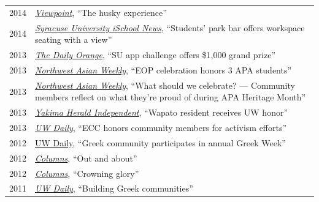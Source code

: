 \documentclass[12pt]{article}
\begin{document}
{\begin{longtable}{R{0.75in}p{5.0in}}
\footnotesize{2014} & \href{https://issuu.com/uwalumni/docs/viewpoint_2014fall}{\textit{Viewpoint}}, ``The husky experience''\\

\footnotesize{2014} & \href{https://web.archive.org/web/2026/https://news.syr.edu/blog/2014/10/28/students-park-bar-offers-workspace-seating-with-a-view-16177/}{\textit{Syracuse University iSchool News}}, ``Students' park bar offers workspace seating with a view''\\

\footnotesize{2013} & \href{https://dailyorange.com/2013/10/su-app-challenge-offers-1000-grand-prize/}{\textit{The Daily Orange}}, ``SU app challenge offers \$1,000 grand prize''\\

\footnotesize{2013} & \href{https://www.nwasianweekly.com/2013/07/uw-2013-eop-celebration-honors-3-apa-students/}{\textit{Northwest Asian Weekly}}, ``EOP celebration honors 3 APA students''\\

\footnotesize{2013} & \href{https://nwasianweekly.com/2013/05/what-should-we-celebrate-community-members-reflect-on-what-theyre-proud-of-during-apa-heritage-month/}{\textit{Northwest Asian Weekly}}, ``What should we celebrate? — Community members reflect on what they’re proud of during APA Heritage Month''\\

\footnotesize{2013} & \href{https://www.yakimaherald.com/news/local/wapato-resident-receives-uw-honor/article_c7041e94-ace9-5168-a364-d0b9206a6a41.html}{\textit{Yakima Herald Independent}}, ``Wapato resident receives UW honor''\\

\footnotesize{2013} & \href{https://www.dailyuw.com/news/article_e5e0683f-d959-5ce1-b1f2-4d23e797b379.html}{\textit{UW Daily}}, ``ECC honors community members for activism efforts''\\

\footnotesize{2012} & \href{https://www.dailyuw.com/news/article_3c781595-0b4d-52be-9a6e-b2c956ae72eb.html}{{UW Daily}}, ``Greek community participates in annual Greek Week''\\

\footnotesize{2012} & \href{https://www.washington.edu/alumni/columns/pdf/columns_september_2012.pdf}{\textit{Columns}}, ``Out and about''\\

\footnotesize{2012} & \href{https://issuu.com/uwalumni/docs/columns_201212}{\textit{Columns}}, ``Crowning glory''\\

\footnotesize{2011} & \href{https://www.dailyuw.com/features/article_17600702-c4b3-57ad-ac29-29a601b88da7.html}{\textit{UW Daily}}, ``Building Greek communities''\\
\end{longtable}}
\end{document}

